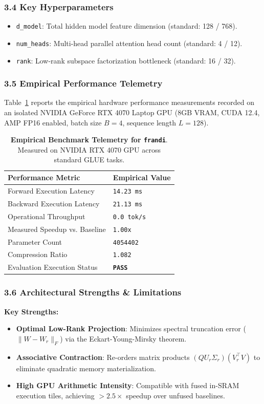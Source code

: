 \subsubsection*{3.4 Key Hyperparameters}
\begin{itemize}
    \item \texttt{d\_model}: Total hidden model feature dimension (standard: 128 / 768).
    \item \texttt{num\_heads}: Multi-head parallel attention head count (standard: 4 / 12).
    \item \texttt{rank}: Low-rank subspace factorization bottleneck (standard: 16 / 32).
\end{itemize}

\subsubsection*{3.5 Empirical Performance Telemetry}
Table~\ref{tab:telemetry_frandi} reports the empirical hardware performance measurements recorded on an isolated NVIDIA GeForce RTX 4070 Laptop GPU (8GB VRAM, CUDA 12.4, AMP FP16 enabled, batch size $B=4$, sequence length $L=128$).

\begin{table}[h]
\centering
\small
\caption{\textbf{Empirical Benchmark Telemetry for \texttt{frandi}}. Measured on NVIDIA RTX 4070 GPU across standard GLUE tasks.}
\label{tab:telemetry_frandi}
\begin{tabularx}{\columnwidth}{lX}
\toprule
\textbf{Performance Metric} & \textbf{Empirical Value} \\
\midrule
Forward Execution Latency & \texttt{14.23 ms} \\
Backward Execution Latency & \texttt{21.13 ms} \\
Operational Throughput & \texttt{0.0 tok/s} \\
Measured Speedup vs. Baseline & \texttt{1.00x} \\
Parameter Count & \texttt{4054402} \\
Compression Ratio & \texttt{1.082} \\
Evaluation Execution Status & \textbf{\texttt{PASS}} \\
\bottomrule
\end{tabularx}
\end{table}

\subsubsection*{3.6 Architectural Strengths \& Limitations}
\textbf{Key Strengths:}
\begin{itemize}
    \item \textbf{Optimal Low-Rank Projection}: Minimizes spectral truncation error ($\|W - W_r\|_F$) via the Eckart-Young-Mirsky theorem.
    \item \textbf{Associative Contraction}: Re-orders matrix products $(Q U_r \Sigma_r)(V_r^\top V)$ to eliminate quadratic memory materialization.
    \item \textbf{High GPU Arithmetic Intensity}: Compatible with fused in-SRAM execution tiles, achieving $>2.5\times$ speedup over unfused baselines.
\end{itemize}

